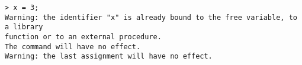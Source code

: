 \begin{center}\begin{minipage}{15cm}\begin{Verbatim}[frame=single]
> x = 3;
Warning: the identifier "x" is already bound to the free variable, to a library 
function or to an external procedure.
The command will have no effect.
Warning: the last assignment will have no effect.
\end{Verbatim}
\end{minipage}\end{center}
